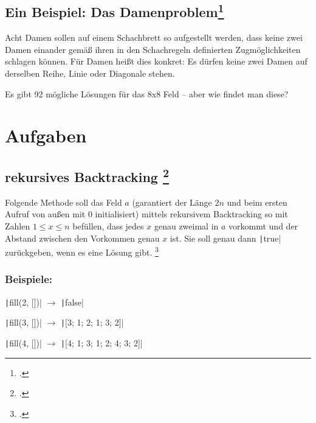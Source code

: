 \documentclass{lehramt-informatik-haupt}
\begin{document}
%

\section{Ein Beispiel: Das Damenproblem\footcite[Seite 18 - 19 (PDF 15-19)]{aud:fs:3}}

Acht Damen sollen auf einem Schachbrett so aufgestellt werden, dass
keine zwei Damen einander gemäß ihren in den Schachregeln definierten
Zugmöglichkeiten schlagen können. Für Damen heißt dies konkret: Es
dürfen keine zwei Damen auf derselben Reihe, Linie oder Diagonale
stehen.

Es gibt 92 mögliche Lösungen für das 8x8 Feld – aber wie findet man
diese?



\chapter{Aufgaben}

\section{rekursives Backtracking
\footcite{aud:pu:3}}

Folgende Methode soll das Feld $a$ (garantiert der Länge $2n$ und beim
ersten Aufruf von außen mit $0$ initialisiert) mittels rekursivem
Backtracking so mit Zahlen $1 \leq x \leq n$ befüllen, dass jedes $x$
genau zweimal in $a$ vorkommt und der Abstand zwischen den Vorkommen
genau $x$ ist. Sie soll genau dann \texttt|true| zurückgeben,
wenn es eine Lösung gibt.
\footcite[Seite 2]{aud:pu:3}

\subsection*{Beispiele:}

\begin{compactitem}
\item \texttt|fill(2, [])| $\rightarrow$ \texttt|false|
\item \texttt|fill(3, [])| $\rightarrow$ \texttt|[3; 1; 2; 1; 3; 2]|
\item \texttt|fill(4, [])| $\rightarrow$ \texttt|[4; 1; 3; 1; 2; 4; 3; 2]|
\end{compactitem}
\end{document}
